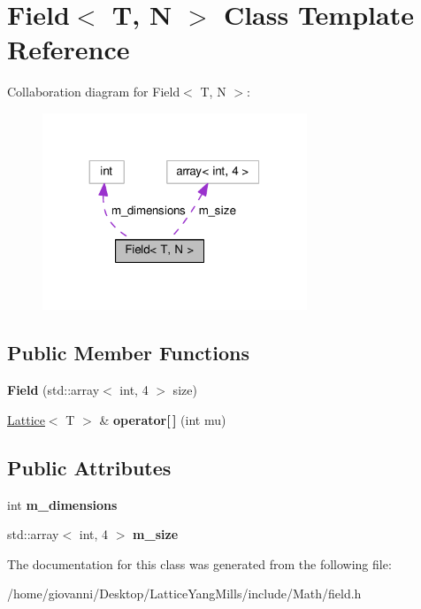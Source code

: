 \hypertarget{classField}{}\section{Field$<$ T, N $>$ Class Template Reference}
\label{classField}


Collaboration diagram for Field$<$ T, N $>$\+:\nopagebreak
\begin{figure}[H]
\begin{center}
\leavevmode
\includegraphics[width=224pt]{classField__coll__graph}
\end{center}
\end{figure}
\subsection*{Public Member Functions}
\begin{DoxyCompactItemize}
\item 
{\bfseries Field} (std\+::array$<$ int, 4 $>$ size)\hypertarget{classField_a25a5869a0faa4d33782cbe9f277f684f}{}\label{classField_a25a5869a0faa4d33782cbe9f277f684f}

\item 
\hyperlink{classLattice}{Lattice}$<$ T $>$ \& {\bfseries operator\mbox{[}$\,$\mbox{]}} (int mu)\hypertarget{classField_a2c9ffced05a0a329395b2d9bca338840}{}\label{classField_a2c9ffced05a0a329395b2d9bca338840}

\end{DoxyCompactItemize}
\subsection*{Public Attributes}
\begin{DoxyCompactItemize}
\item 
int {\bfseries m\+\_\+dimensions}\hypertarget{classField_ada68c99dbc291529adcbc58c87273403}{}\label{classField_ada68c99dbc291529adcbc58c87273403}

\item 
std\+::array$<$ int, 4 $>$ {\bfseries m\+\_\+size}\hypertarget{classField_ae6a537c53432f6631a5e6eb624deea90}{}\label{classField_ae6a537c53432f6631a5e6eb624deea90}

\end{DoxyCompactItemize}


The documentation for this class was generated from the following file\+:\begin{DoxyCompactItemize}
\item 
/home/giovanni/\+Desktop/\+Lattice\+Yang\+Mills/include/\+Math/field.\+h\end{DoxyCompactItemize}
